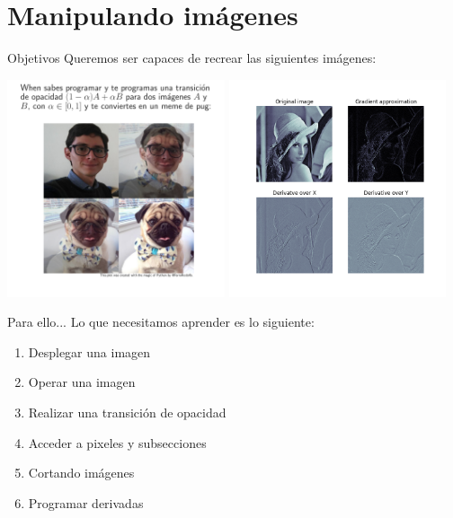 \documentclass[usenames,dvipsnames]{beamer}
\begin{document}
  \section{Manipulando imágenes}
  \begin{frame}{Objetivos}
    Queremos ser capaces de recrear las siguientes imágenes:
    \begin{center}
      \includegraphics[width=0.48\textwidth]{imgs/meme}\hspace{0.1cm}
      \includegraphics[width=0.48\textwidth]{imgs/derivatives}
    \end{center}
  \end{frame}

  \begin{frame}{Para ello...}
    Lo que necesitamos aprender es lo siguiente:
    \vspace*{0.5cm}
    \begin{enumerate}
      \item Desplegar una imagen
      \item Operar una imagen
      \item Realizar una transición de opacidad
      \item Acceder a pixeles y subsecciones
      \item Cortando imágenes
      \item Programar derivadas
    \end{enumerate}
  \end{frame}
\end{document}
